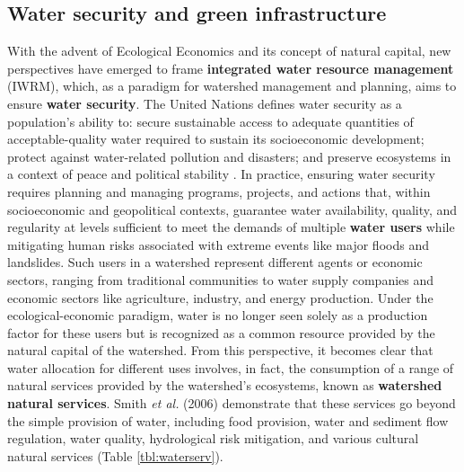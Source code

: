 \documentclass[./main_en.tex]{subfiles}
\begin{document}
\subsection{Water security and green infrastructure} \label{sec:watersheds:watersecurity}

\par With the advent of Ecological Economics and its concept of natural capital, new perspectives have emerged to frame \textbf{integrated water resource management} (IWRM), which, as a paradigm for watershed management and planning, aims to ensure \textbf{water security}. The United Nations defines water security as a population’s ability to: secure sustainable access to adequate quantities of acceptable-quality water required to sustain its socioeconomic development; protect against water-related pollution and disasters; and preserve ecosystems in a context of peace and political stability \cite{cassin2021}. In practice, ensuring water security requires planning and managing programs, projects, and actions that, within socioeconomic and geopolitical contexts, guarantee water availability, quality, and regularity at levels sufficient to meet the demands of multiple \textbf{water users} while mitigating human risks associated with extreme events like major floods and landslides. Such users in a watershed represent different agents or economic sectors, ranging from traditional communities to water supply companies and economic sectors like agriculture, industry, and energy production. Under the ecological-economic paradigm, water is no longer seen solely as a production factor for these users but is recognized as a common resource provided by the natural capital of the watershed. From this perspective, it becomes clear that water allocation for different uses involves, in fact, the consumption of a range of natural services provided by the watershed's ecosystems, known as \textbf{watershed natural services}. Smith \textit{et al.} (2006) \cite{Smith2006a} demonstrate that these services go beyond the simple provision of water, including food provision, water and sediment flow regulation, water quality, hydrological risk mitigation, and various cultural natural services (Table \ref{tbl:waterserv}).
\end{document}
